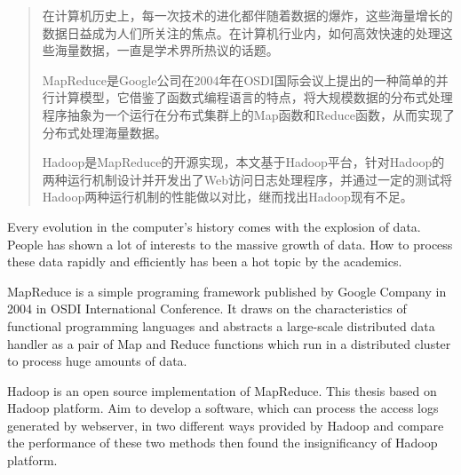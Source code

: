 \begin{abstract}
在计算机历史上，每一次技术的进化都伴随着数据的爆炸，这些海量增长的数据日益成为人们所关注的焦点。在计算机行业内，如何高效快速的处理这些海量数据，一直是学术界所热议的话题。

MapReduce是Google公司在2004年在OSDI国际会议上提出的一种简单的并行计算模型，它借鉴了函数式编程语言的特点，将大规模数据的分布式处理程序抽象为一个运行在分布式集群上的Map函数和Reduce函数，从而实现了分布式处理海量数据。

Hadoop是MapReduce的开源实现，本文基于Hadoop平台，针对Hadoop的两种运行机制设计并开发出了Web访问日志处理程序，并通过一定的测试将Hadoop两种运行机制的性能做以对比，继而找出Hadoop现有不足。

\end{abstract}

\begin{englishabstract}
Every evolution in the computer's history comes with the explosion of data. People has shown a lot of interests to the massive growth of data. How to process these data rapidly and efficiently has been a hot topic by the academics. 

MapReduce is a simple programing framework published by Google Company in 2004 in OSDI International Conference. It draws on the characteristics of functional programming languages​​ and abstracts a large-scale distributed data handler as a pair of Map and Reduce functions which run in a distributed cluster to process huge amounts of data. 

Hadoop is an open source implementation of MapReduce. This thesis based on Hadoop platform. Aim to develop a software, which can process the access logs generated by webserver, in two different ways provided by Hadoop and compare the performance of these two methods then found the insignificancy of Hadoop platform.

\end{englishabstract}

